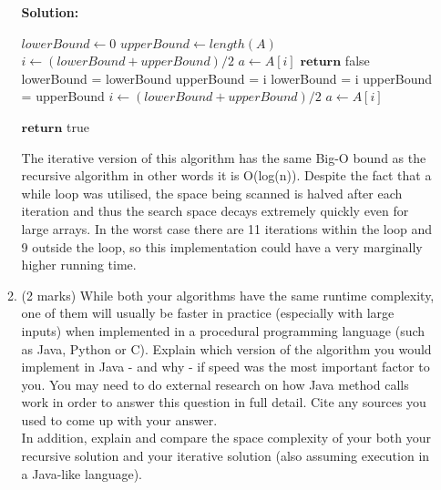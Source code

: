 \documentclass[a4,13pt]{extarticle}
\newenvironment{Solution}{\color{blue}\textbf{Solution:}}{}
\begin{document}
\begin{enumerate}
\begin{enumerate}
			\begin{Solution}
				\begin{algorithm}
					\begin{algorithmic}[1]
						\State $lowerBound \gets 0$
						\State $upperBound \gets length(A)$
						\State $i \gets (lowerBound + upperBound)/2$
						\State $a \gets A[i]$
								\State $\textbf{return}$ false
							\EndIf
								\State lowerBound = lowerBound
								\State upperBound = i
							\EndIf
							\If {$a < i$}
								\State lowerBound = i
								\State upperBound = upperBound
							\EndIf
							\State $i \gets (lowerBound + upperBound)/2$
							\State $a \gets A[i]$
						\EndWhile

						\State $\textbf{return}$ true
						\EndProcedure
					\end{algorithmic}
				\end{algorithm}

				The iterative version of this algorithm has the same Big-O bound as the recursive algorithm in other words it is O(log(n)). Despite the fact that a while loop was utilised, the space being scanned is halved after each iteration and thus the search space decays extremely quickly even for large arrays. In the worst case there are 11 iterations within the loop and 9 outside the loop, so this implementation could have a very marginally higher running time.
	      	\end{Solution}
	      	      	      	                  
	      	\item (2 marks) While both your algorithms have the same runtime complexity, one of them will usually be faster in practice 
	      	      (especially with large inputs) when implemented in a procedural programming language (such as Java, Python or C). 
	      	      Explain which version of the algorithm you would implement in Java - and why - if speed was the most important factor to you. 
	      	      You may need to do external research on how Java method calls work in order to answer this question in full detail. 
	      	      Cite any sources you used to come up with your answer.\\
	      	      	      	                  
	      	      In addition, explain and compare the space complexity of your both your recursive solution 
	      	      and your iterative solution (also assuming execution in a Java-like language).
	      	      

\end{enumerate}
\end{enumerate}
\end{document}
